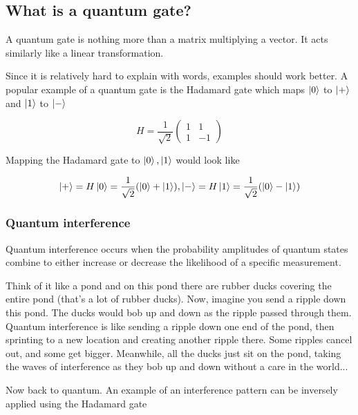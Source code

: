 \documentclass[11pt]{article}
\begin{document}
\subsection{What is a quantum gate?} A quantum gate is nothing more than a matrix multiplying a vector. It acts similarly like a linear transformation.


Since it is relatively hard to explain with words, examples should work better. A popular example of a quantum gate is the Hadamard gate which maps $\ket{0}$ to $\ket{+}$ and $\ket{1}$ to $\ket{-}$

\begin{equation*}
	H = \frac{1}{\sqrt2} \begin{pmatrix} 1 & 1 \\ 1 & -1 \end{pmatrix}
\end{equation*}

Mapping the Hadamard gate to $\ket{0}, \ket{1}$ would look like

\begin{equation*}
	\ket{+} = H\ket{0} = \frac{1}{\sqrt2}(\ket{0} + \ket{1}), \ket{-} = H\ket{1} = \frac{1}{\sqrt2}(\ket{0} - \ket{1})
\end{equation*}

\subsubsection{Quantum interference}

Quantum interference occurs when the probability amplitudes of quantum states combine to either increase or decrease the likelihood of a specific measurement.

Think of it like a pond and on this pond there are rubber ducks covering the entire pond (that's a lot of rubber ducks). Now, imagine you send a ripple down this pond. The ducks would bob up and down as the ripple passed through them. Quantum interference is like sending a ripple down one end of the pond, then sprinting to a new location and creating another ripple there. Some ripples cancel out, and some get bigger. Meanwhile, all the ducks just sit on the pond, taking the waves of interference as they bob up and down without a care in the world...

Now back to quantum. An example of an interference pattern can be inversely applied using the Hadamard gate
\end{document}
